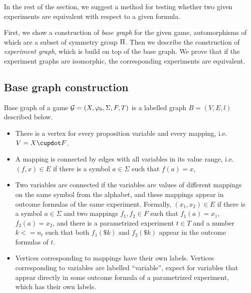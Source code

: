 In the rest of the section, we suggest a method for testing
  whether two given experiments are equivalent with respect to a given formula.

First, we show a construction of \emph{base graph} for the given game,
  automorphisms of which are a subset of symmetry group $\Pi$.
Then we describe the construction of \emph{experiment graph},
  which is build on top of the base graph.
  We prove
  that if the experiment graphs are isomorphic,
  the corresponding experiments are equivalent.

\subsection{Base graph construction}
Base graph of a game $\mathcal{G} = (X, \varphi_0, \Sigma, F, T)$ is a labelled graph $B = (V,E,l)$ described below.
\begin{itemize}
\item There is a vertex for every proposition variable and every mapping, i.e. $V = \Var \cupdot F$.
\item A mapping is connected by edges with all variables in its value range, i.e. $(f, x) \in E$ if there is a symbol $a\in\Sigma$ such that $f(a) = x$,
\item Two variables are connected if the variables are values
  of different mappings on the same symbol from the alphabet,
  and these mappings appear in outcome formulas of the same experiment.
  Formally, $(x_1, x_2) \in E$ if there is a symbol $a\in\Sigma$ and two mappings
  $f_1,f_2\in F$ such that $f_1(a) = x_1$, $f_2(a) = x_2$, and
  there is a parametrized experiment $t\in T$ and a number $k <= n_t$ such that
  both $f_1(\$k)$ and $f_2(\$k)$ appear in the outcome formulas of $t$.
\item
  Vertices corresponding to mappings have their own labels.
  Vertices corresponding to variables are labelled ``variable'',
  expect for variables that appear directly in some outcome formula
  of a parametrized experiment, which has their own labels.
\end{itemize}

